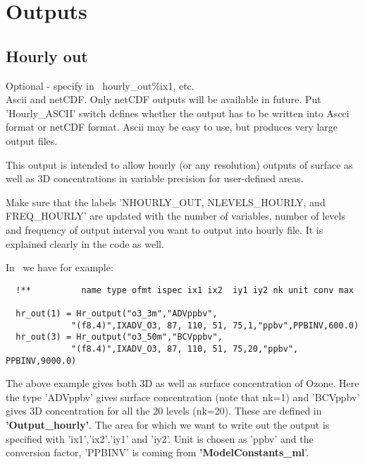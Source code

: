 \chapter{Outputs}
\label{OUTPUTS}




\section{Hourly out}

\noindent
Optional -  specify in \MyOutputs\, hourly\_out\%ix1, etc.\\
Ascii and netCDF.  Only netCDF outputs will be available in future. 
Put 'Hourly\_ASCII' switch defines whether the output has to be written
into Ascci format or netCDF format.  Ascii may be easy to use, but
produces very large output files.  

\vspace{1cm}

This output is intended to allow hourly (or any resolution) outputs of surface
as well as 3D concentrations in
variable precision for user-defined areas.  

Make sure that the labels 'NHOURLY\_OUT, NLEVELS\_HOURLY, and FREQ\_HOURLY' are updated with the number of
variables, number of levels and frequency of output interval you want
to output into hourly file.  It is explained clearly in the code as
well.  

 
In \MyOutputs\ we have for example:

\begin{small}\begin{verbatim}
  !**          name type ofmt ispec ix1 ix2  iy1 iy2 nk unit conv max

  hr_out(1) = Hr_output("o3_3m","ADVppbv", 
             "(f8.4)",IXADV_O3, 87, 110, 51, 75,1,"ppbv",PPBINV,600.0)
  hr_out(3) = Hr_output("o3_50m","BCVppbv",
             "(f8.4)",IXADV_O3, 87, 110, 51, 75,20,"ppbv", PPBINV,9000.0)
\end{verbatim}
\end{small}

The above example gives both 3D as well as surface concentration of
Ozone.  Here the type 'ADVppbv' gives surface concentration (note
that nk=1) and 'BCVppbv' gives 3D concentration for all the 20 levels
(nk=20). These are defined in {\bf 'Output\_hourly'}.  The area for which we want to write out the output is
specified with 'ix1','ix2','iy1' and 'iy2'.  Unit is chosen as 'ppbv'
and the conversion factor, 'PPBINV' is coming from
{\bf 'ModelConstants\_ml}'.  


